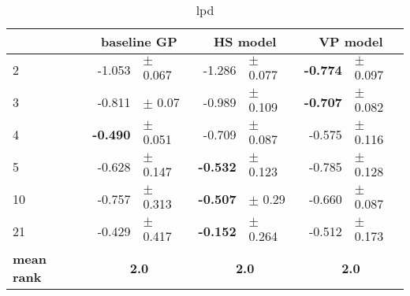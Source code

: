 \begin{table}[] 
 \centering
\begin{tabular}{lrlrlrl}
\hline
 &  \multicolumn{2}{c}{baseline GP}  &  \multicolumn{2}{c}{HS model}  &  \multicolumn{2}{c}{VP model}  \\
\hline
2 & -1.053 & $\pm$ 0.067 & -1.286 & $\pm$ 0.077 & \textbf{-0.774} & $\pm$ 0.097 \\
3 & -0.811 & $\pm$ 0.07 & -0.989 & $\pm$ 0.109 & \textbf{-0.707} & $\pm$ 0.082 \\
4 & \textbf{-0.490} & $\pm$ 0.051 & -0.709 & $\pm$ 0.087 & -0.575 & $\pm$ 0.116 \\
5 & -0.628 & $\pm$ 0.147 & \textbf{-0.532} & $\pm$ 0.123 & -0.785 & $\pm$ 0.128 \\
10 & -0.757 & $\pm$ 0.313 & \textbf{-0.507} & $\pm$ 0.29 & -0.660 & $\pm$ 0.087 \\
21 & -0.429 & $\pm$ 0.417 & \textbf{-0.152} & $\pm$ 0.264 & -0.512 & $\pm$ 0.173 \\
\hline
\textbf{mean rank} & \multicolumn{2}{c}{\textbf{2.0}} & \multicolumn{2}{c}{\textbf{2.0}} & \multicolumn{2}{c}{\textbf{2.0}}\\
\hline
\end{tabular}
\caption{lpd}
\label{tab:lpd}
\end{table}
